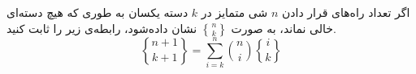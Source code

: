     اگر تعداد راه‌های قرار دادن $n$ شی متمایز در $k$ دسته یکسان به طوری که هیچ دسته‌ای خالی نماند،
    به صورت 
    $\genfrac{\{}{\}}{0pt}{}{n}{k}$
    نشان داده‌شود، رابطه‌ی زیر را ثابت کنید.        
    $$\genfrac{\{}{\}}{0pt}{}{n + 1}{k + 1} = \sum\limits_{i=k}^{n} {n\choose i} \genfrac{\{}{\}}{0pt}{}{i}{k}$$